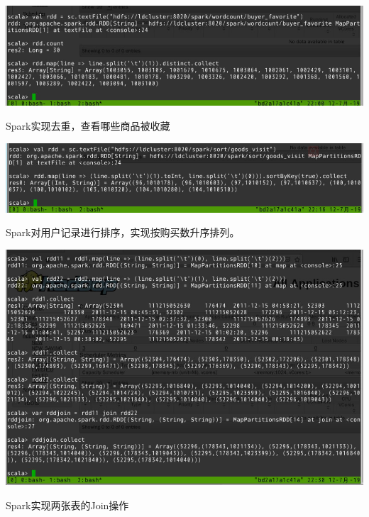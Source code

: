 \documentclass[UTF8]{report}
\begin{document}
\begin{center}
    \includegraphics[width=\linewidth]{spark/rdd2.png}

    Spark实现去重，查看哪些商品被收藏
\end{center}
    


\begin{center}
    \includegraphics[width=\linewidth]{spark/rddsort.png}

    Spark对用户记录进行排序，实现按购买数升序排列。
\end{center}
    




\begin{center}
    \includegraphics[width=\linewidth]{spark/rddjoin.png}

    Spark实现两张表的Join操作
\end{center}
\end{document}
